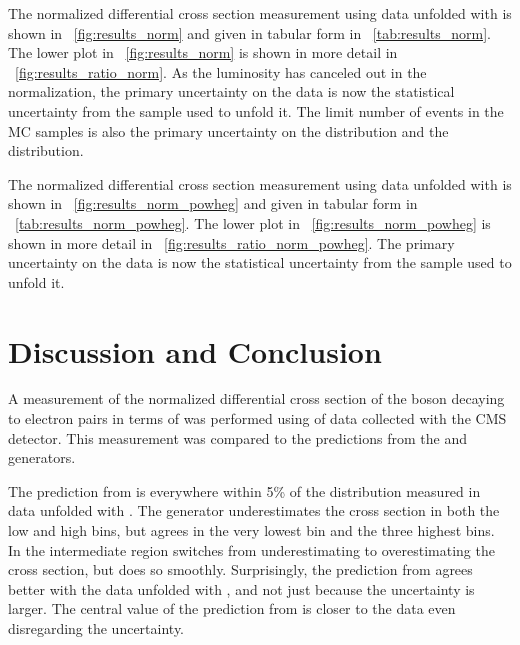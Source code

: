 The normalized differential cross section measurement using data unfolded with
\MADGRAPH is shown in \FIG~\ref{fig:results_norm} and given in tabular form in
\TAB~\ref{tab:results_norm}. The lower plot in \FIG~\ref{fig:results_norm} is
shown in more detail in \FIG~\ref{fig:results_ratio_norm}. As the luminosity
has canceled out in the normalization, the primary uncertainty on the data is
now the statistical uncertainty from the \MADGRAPH sample used to unfold it.
The limit number of events in the MC samples is also the primary uncertainty on
the \MADGRAPH distribution and the \POWHEG distribution.




The normalized differential cross section measurement using data unfolded with
\POWHEG is shown in \FIG~\ref{fig:results_norm_powheg} and given in tabular
form in \TAB~\ref{tab:results_norm_powheg}. The lower plot in
\FIG~\ref{fig:results_norm_powheg} is shown in more detail in
\FIG~\ref{fig:results_ratio_norm_powheg}. The primary uncertainty on the data
is now the statistical uncertainty from the \POWHEG sample used to unfold it.




\section{Discussion and Conclusion}
\label{sec:discussion}

A measurement of the normalized differential cross section of the \Z boson
decaying to electron pairs in terms of \phistar was performed using
\GoodLumiNumber of \rootseight data collected with the CMS detector. This
measurement was compared to the predictions from the \MADGRAPH and \POWHEG
generators.

The prediction from \MADGRAPH is everywhere within 5\% of the distribution
measured in data unfolded with \MADGRAPH. The generator underestimates the
cross section in both the low and high \phistar bins, but agrees in the very
lowest bin and the three highest bins. In the intermediate region \MADGRAPH
switches from underestimating to overestimating the cross section, but does so
smoothly. Surprisingly, the prediction from \MADGRAPH agrees better with the
data unfolded with \POWHEG, and not just because the uncertainty is larger. The
central value of the prediction from \MADGRAPH is closer to the data even
disregarding the uncertainty.

